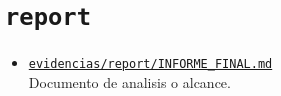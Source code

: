 \section{\texorpdfstring{\nolinkurl{report}}{report}}
\begin{itemize}[leftmargin=1.2em]
  \item \href{https://github.com/gamurigm/inventrack-ptes-report/blob/main/evidencias/report/INFORME_FINAL.md}{\nolinkurl{evidencias/report/INFORME_FINAL.md}}\\
  {\small Documento de analisis o alcance.}
\end{itemize}
